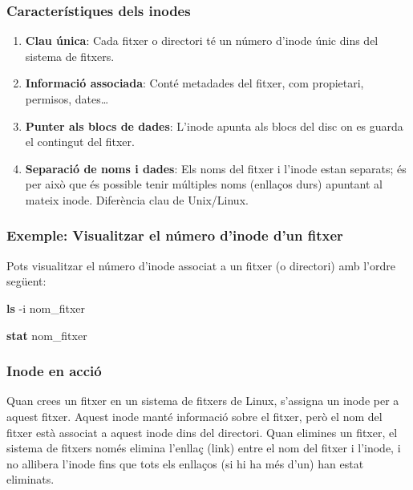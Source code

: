 \documentclass[
  12 pt,
  a4paper,
]{article}
\newenvironment{Shaded}{\begin{snugshade}}{\end{snugshade}}
\newcommand{\AttributeTok}[1]{\textcolor[rgb]{0.13,0.29,0.53}{#1}}
\newcommand{\FunctionTok}[1]{\textcolor[rgb]{0.13,0.29,0.53}{\textbf{#1}}}
\newcommand{\NormalTok}[1]{#1}
\providecommand{\tightlist}{%
  \setlength{\itemsep}{0pt}\setlength{\parskip}{0pt}}
\begin{document}
\subsubsection{Característiques dels
inodes}\label{caracteruxedstiques-dels-inodes}

\begin{enumerate}
\def\labelenumi{\arabic{enumi}.}
\tightlist
\item
  \textbf{Clau única}: Cada fitxer o directori té un número d'inode únic
  dins del sistema de fitxers.
\item
  \textbf{Informació associada}: Conté metadades del fitxer, com
  propietari, permisos, dates\ldots{}
\item
  \textbf{Punter als blocs de dades}: L'inode apunta als blocs del disc
  on es guarda el contingut del fitxer.
\item
  \textbf{Separació de noms i dades}: Els noms del fitxer i l'inode
  estan separats; és per això que és possible tenir múltiples noms
  (enllaços durs) apuntant al mateix inode. Diferència clau de
  Unix/Linux.
\end{enumerate}

\subsubsection{Exemple: Visualitzar el número d'inode d'un
fitxer}\label{exemple-visualitzar-el-nuxfamero-dinode-dun-fitxer}

Pots visualitzar el número d'inode associat a un fitxer (o directori)
amb l'ordre següent:

\begin{Shaded}
\begin{Highlighting}[]
\FunctionTok{ls} \AttributeTok{{-}i}\NormalTok{ nom\_fitxer}
\end{Highlighting}
\end{Shaded}

\begin{Shaded}
\begin{Highlighting}[]
\FunctionTok{stat}\NormalTok{ nom\_fitxer}
\end{Highlighting}
\end{Shaded}

\subsubsection{Inode en acció}\label{inode-en-acciuxf3}

Quan crees un fitxer en un sistema de fitxers de Linux, s'assigna un
inode per a aquest fitxer. Aquest inode manté informació sobre el
fitxer, però el nom del fitxer està associat a aquest inode dins del
directori. Quan elimines un fitxer, el sistema de fitxers només elimina
l'enllaç (link) entre el nom del fitxer i l'inode, i no allibera l'inode
fins que tots els enllaços (si hi ha més d'un) han estat eliminats.
\end{document}
